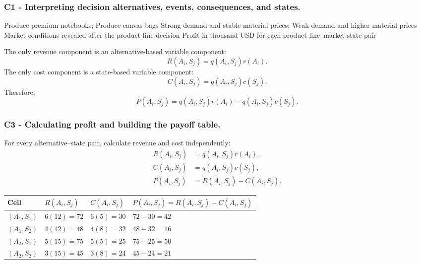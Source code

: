 \subsubsection*{C1 - Interpreting decision alternatives, events, consequences, and states.}
\label{subsec:problem5-custom-printing-product-line-c1}

\DecisionElementsTable
{Produce premium notebooks; Produce canvas bags}
{Strong demand and stable material prices; Weak demand and higher material prices}
{Market conditions revealed after the product-line decision}
{Profit in thousand USD for each product-line--market-state pair}

The only revenue component is an alternative-based variable component:
\[
R(A_i,S_j)=q(A_i,S_j)r(A_i).
\]
The only cost component is a state-based variable component:
\[
C(A_i,S_j)=q(A_i,S_j)c(S_j).
\]
Therefore,
\[
P(A_i,S_j)
=
q(A_i,S_j)r(A_i)
-
q(A_i,S_j)c(S_j).
\]


\subsubsection*{C3 - Calculating profit and building the payoff table.}
\label{subsec:problem5-custom-printing-product-line-c3}

For every alternative--state pair, calculate revenue and cost independently:
\[
\begin{aligned}
	R(A_i,S_j)&=q(A_i,S_j)r(A_i),
	\\
	C(A_i,S_j)&=q(A_i,S_j)c(S_j),
	\\
	P(A_i,S_j)&=R(A_i,S_j)-C(A_i,S_j).
\end{aligned}
\]

\begin{center}
	\small
	\begin{tabular}{llll}
		\toprule
		Cell
		& \(R(A_i,S_j)\)
		& \(C(A_i,S_j)\)
		& \(P(A_i,S_j)=R(A_i,S_j)-C(A_i,S_j)\) \\
		\midrule
		\((A_1,S_1)\)
		& \(6(12)=72\)
		& \(6(5)=30\)
		& \(72-30=42\) \\
		
		\((A_1,S_2)\)
		& \(4(12)=48\)
		& \(4(8)=32\)
		& \(48-32=16\) \\
		
		\((A_2,S_1)\)
		& \(5(15)=75\)
		& \(5(5)=25\)
		& \(75-25=50\) \\
		
		\((A_2,S_2)\)
		& \(3(15)=45\)
		& \(3(8)=24\)
		& \(45-24=21\) \\
		\bottomrule
	\end{tabular}
\end{center}

